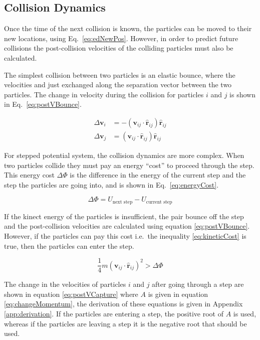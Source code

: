 \documentclass[12pt]{UoAthesis}
\begin{document}
\subsection{Collision Dynamics \label{sec:CollDyn}}
Once the time of the next collision is known, the particles can be
moved to their new locations, using Eq.~\eqref{eq:edNewPos}. However,
in order to predict future collisions the post-collision velocities of
the colliding particles must also be calculated.  

The simplest collision between two particles is an elastic bounce,
where the velocities and just exchanged along the separation vector
between the two particles.  The change in velocity during the
collision for particles $i$ and $j$ is shown in
Eq.~\eqref{eq:postVBounce}.

\begin{subequations}
  \label{eq:postVBounce}
  \begin{align}
    \Delta\mathbf{v}_i &= -(\mathbf{v}_{ij}\cdot\mathbf{\hat{r}}_{ij})\mathbf{\hat{r}}_{ij} \\
    \Delta\mathbf{v}_j &= (\mathbf{v}_{ij}\cdot\mathbf{\hat{r}}_{ij})\mathbf{\hat{r}}_{ij}
  \end{align}
\end{subequations}

For stepped potential system, the collision dynamics are more complex.
When two particles collide they must pay an energy ``cost'' to proceed
through the step.  This energy cost $\Delta \Phi$ is the difference in
the energy of the current step and the step the particles are going
into, and is shown in Eq.~\eqref{eq:energyCost}.

\begin{equation}
  \label{eq:energyCost}
  \Delta \Phi = U_{\text{next step}} - U_{\text{current step}}
\end{equation}

If the kinect energy of the particles is insufficient, the pair bounce
off the step and the post-collision velocities are calculated using
equation \eqref{eq:postVBounce}. However, if the particles can pay
this cost i.e.\ the inequality \eqref{eq:kineticCost} is true, then the
particles can enter the step.

\begin{equation}
\label{eq:kineticCost}
  \frac{1}{4}m(\mathbf{v}_{ij}\cdot\mathbf{\hat{r}}_{ij})^2 > \Delta \Phi
\end{equation}

The change in the velocities of particles $i$ and $j$ after going
through a step are shown in equation \eqref{eq:postVCapture} where $A$
is given in equation \eqref{eq:changeMomentum}, the derivation of
these equations is given in Appendix \ref{app:derivation}.  If the
particles are entering a step, the positive root of $A$ is used,
whereas if the particles are leaving a step it is the negative root
that should be used.
\end{document}
